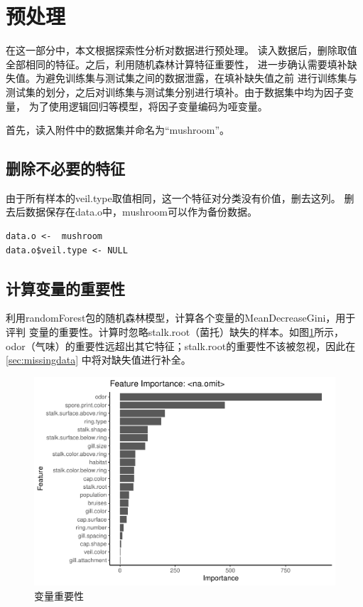 \documentclass[lang=cn,11pt,a4paper,cite=super]{elegantpaper}
\begin{document}
\section{预处理}
在这一部分中，本文根据探索性分析对数据进行预处理。
读入数据后，删除取值全部相同的特征。之后，利用随机森林计算特征重要性，
进一步确认需要填补缺失值。为避免训练集与测试集之间的数据泄露，在填补缺失值之前
进行训练集与测试集的划分，之后对训练集与测试集分别进行填补。由于数据集中均为因子变量，
为了使用逻辑回归等模型，将因子变量编码为哑变量。
\par 首先，读入附件中的数据集并命名为“mushroom”。
\subsection{删除不必要的特征}\label{sec:delveil}
由于所有样本的veil.type取值相同，这一个特征对分类没有价值，删去这列。
删去后数据保存在data.o中，mushroom可以作为备份数据。
\begin{lstlisting}[style=R]
data.o <-  mushroom
data.o$veil.type <- NULL  
\end{lstlisting}

\subsection{计算变量的重要性}
利用randomForest包的随机森林模型，计算各个变量的MeanDecreaseGini，用于评判
变量的重要性。计算时忽略stalk.root（菌托）缺失的样本。如图\ref{fig:imp}所示，
odor（气味）的重要性远超出其它特征；stalk.root的重要性不该被忽视，因此在\ref{sec:missingdata}
中将对缺失值进行补全。
\begin{figure}[htb]
   \centering
   \includegraphics[width=0.9\linewidth]{img/import.omit-1.pdf}
   \caption{变量重要性}
   \label{fig:imp}
\end{figure}
\end{document}
